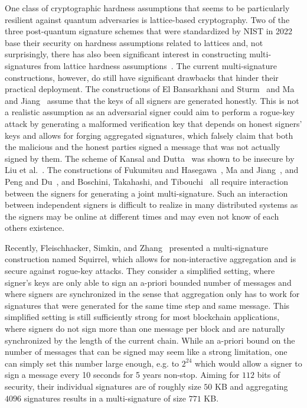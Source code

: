 One class of cryptographic hardness assumptions that seems to be particularly resilient against quantum adversaries is lattice-based cryptography.
Two of the three post-quantum signature schemes that were standardized by NIST in 2022 base their security on hardness assumptions related to lattices and, not surprisingly, there has also been significant interest in constructing multi-signatures from lattice hardness assumptions~\cite{CANS:ElBStu16,FukHas19,MaJia19,PenDu20,AFRICACRYPT:KanDut20,PROVSEC:FukHas20,PKC:DOTT21,C:BosTakTib22, CCS:FleSimZha22}.
The current multi-signature constructions, however, do still have significant drawbacks that hinder their practical deployment.
The constructions of El Bansarkhani and Sturm~\cite{CANS:ElBStu16} and Ma and Jiang~\cite{MaJia19} assume that the keys of all signers are generated honestly. 
This is not a realistic assumption as an adversarial signer could aim to perform a rogue-key attack by generating a malformed verification key that depends on honest signers' keys and allows for forging aggregated signatures, which falsely claim that both the malicious and the honest parties signed a message that was not actually signed by them.
The scheme of Kansal and Dutta~\cite{AFRICACRYPT:KanDut20} was shown to be insecure by Liu et al.~\cite{EPRINT:LiuTseTso20b}.
The constructions of Fukumitsu and Hasegawa~\cite{FukHas19,PROVSEC:FukHas20}, Ma and Jiang~\cite{MaJia19}, and Peng and Du~\cite{PenDu20}, and Boschini, Takahashi, and Tibouchi~\cite{C:BosTakTib22} all require interaction between the signers for generating a joint multi-signature.
Such an interaction between independent signers is difficult to realize in many distributed systems as the signers may be online at different times and may even not know of each others existence.

Recently, Fleischhacker, Simkin, and Zhang~\cite{CCS:FleSimZha22} presented a multi-signature construction named Squirrel, which allows for non-interactive aggregation and is secure against rogue-key attacks.
They consider a simplified setting, where signer's keys are only able to sign an a-priori bounded number of messages and where signers are synchronized in the sense that aggregation only has to work for signatures that were generated for the same time step and same message.
This simplified setting is still sufficiently strong for most blockchain applications, where signers do not sign more than one message per block and are naturally synchronized by the length of the current chain.
While an a-priori bound on the number of messages that can be signed may seem like a strong limitation, one can simply set this number large enough, e.g. to $2^{24}$ which would allow a signer to sign a message every 10 seconds for 5 years non-stop.
Aiming for $112$ bits of security, their individual signatures are of roughly size $50$ KB and aggregating $4096$ signatures results in a multi-signature of size $771$ KB.

